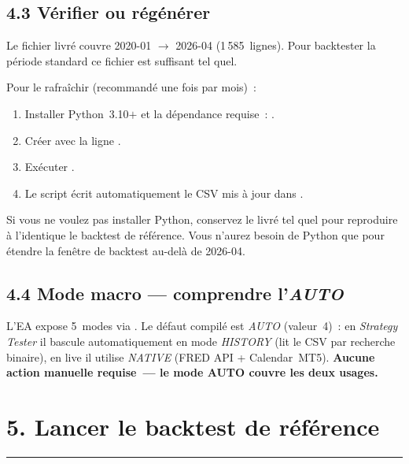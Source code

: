 \documentclass[11pt, a4paper]{scrartcl}
\begin{document}
\subsection*{4.3 Vérifier ou régénérer }

Le fichier livré couvre 2020-01 $\rightarrow$ 2026-04 (1\,585~lignes). Pour
backtester la période standard ce fichier est suffisant tel quel.

Pour le rafraîchir (recommandé une fois par mois)~:

\begin{enumerate}
\item Installer Python~3.10$+$ et la dépendance requise~:
  .
\item Créer  avec la ligne .
\item Exécuter .
\item Le script écrit automatiquement le CSV mis à jour dans
.
\end{enumerate}

\begin{insightbox}
Si vous ne voulez pas installer Python, conservez le 
livré tel quel pour reproduire à l'identique le backtest de référence. Vous
n'aurez besoin de Python que pour étendre la fenêtre de backtest au-delà
de 2026-04.
\end{insightbox}

\subsection*{4.4 Mode macro --- comprendre l'\emph{AUTO}}

L'EA expose 5~modes via . Le défaut compilé
est \emph{AUTO} (valeur~4)~: en \emph{Strategy Tester} il bascule
automatiquement en mode \emph{HISTORY} (lit le CSV par recherche
binaire), en live il utilise \emph{NATIVE} (FRED API + Calendar~MT5).
\textbf{Aucune action manuelle requise~--- le mode AUTO couvre les
deux usages.}


\section*{5. Lancer le backtest de référence}
\vspace{-0.4em}
{\color{accent}\rule{\linewidth}{1.0pt}}\\[0.4em]
\end{document}
